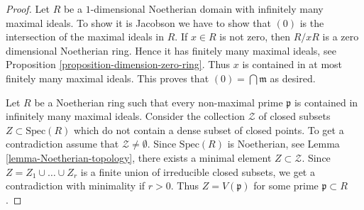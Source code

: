 \begin{proof}
Let $R$ be a $1$-dimensional Noetherian domain with
infinitely many maximal ideals. To show it is Jacobson
we have to show that $(0)$ is the intersection of 
the maximal ideals in $R$.
If $x \in R$ is not zero, then $R/xR$ is
a zero dimensional Noetherian ring.
Hence it has finitely many
maximal ideals, see Proposition \ref{proposition-dimension-zero-ring}. Thus
$x$ is contained in at most finitely many maximal ideals.
This proves that $(0) = \bigcap \mathfrak m$ as desired.

\medskip\noindent
Let $R$ be a Noetherian ring such that
every non-maximal prime $\mathfrak p$ is contained
in infinitely many maximal ideals. Consider the
collection $\mathcal{Z}$ of closed subsets $Z \subset \text{Spec}(R)$
which do not contain a dense subset of closed points.
To get a contradiction assume that $\mathcal{Z} \not = \emptyset$.
Since $\text{Spec}(R)$ is Noetherian, see
Lemma \ref{lemma-Noetherian-topology}, there exists a
minimal element $Z \subset \mathcal{Z}$. Since
$Z = Z_1 \cup \ldots \cup Z_r$ is a finite union
of irreducible closed subsets, we get a contradiction
with minimality if $r > 0$. Thus $Z = V(\mathfrak p)$
for some prime $\mathfrak p \subset R$.


\end{proof}

